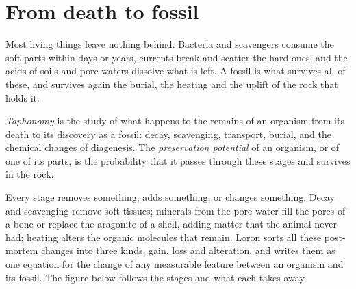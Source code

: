 \section{From death to fossil}\label{sec:b2:palaeoenvironments:taphonomy}

Most living things leave nothing behind. Bacteria and scavengers consume the soft parts within
days or years, currents break and scatter the hard ones, and the acids of soils and pore waters
dissolve what is left. A fossil is what survives all of these, and survives again the burial,
the heating and the uplift of the rock that holds it.

\begin{definition}\label{def:b2:palaeoenvironments:taphonomy}
\emph{Taphonomy} is the study of what happens to the remains of an organism
from its death to its discovery as a fossil: decay, scavenging, transport, burial, and the
chemical changes of diagenesis. The \emph{preservation potential}
of an organism, or of one of its parts, is the probability that it passes through these stages
and survives in the rock.
\end{definition}

Every stage removes something, adds something, or changes something. Decay and scavenging remove
soft tissues; minerals from the pore water fill the pores of a bone or replace the aragonite of a
shell, adding matter that the animal never had; heating alters the organic molecules that remain.
Loron sorts all these post-mortem changes into three kinds, gain, loss and alteration, and
writes them as one equation for the change of any measurable feature between an organism and its
fossil. The figure below follows the stages and what each takes away.

